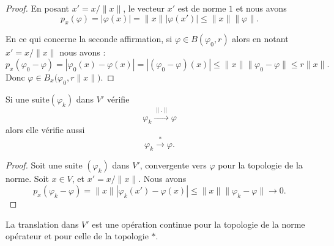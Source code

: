 \begin{proof}
	En posant \( x'=x/\| x \|\), le vecteur \( x'\) est de norme \( 1\) et nous avons
	\begin{equation}
		p_x(\varphi)=| \varphi(x) |=\| x \|| \varphi(x') |\leq \| x \|\| \varphi \|.
	\end{equation}

	En ce qui concerne la seconde affirmation, si \( \varphi\in B(\varphi_0,r)\) alors en notant \( x'=x/\| x \|\) nous avons :
	\begin{equation}
		p_x(\varphi_0-\varphi)=| \varphi_0(x)-\varphi(x) |=| (\varphi_0-\varphi)(x) |\leq \| x \|\| \varphi_0-\varphi \|\leq r\| x \|.
	\end{equation}
	Donc \( \varphi\in B_x\big( \varphi_0, r\| x \| \big)\).
\end{proof}

\begin{proposition}     \label{PROPooMINIooGCWsPR}
	Si une suite\( (\varphi_k)\) dans \( V'\) vérifie
	\begin{equation}
		\varphi_k\stackrel{\| . \|}{\longrightarrow}\varphi
	\end{equation}
	alors elle vérifie aussi
	\begin{equation}
		\varphi_k\stackrel{*}{\longrightarrow}\varphi.
	\end{equation}
\end{proposition}

\begin{proof}
	Soit une suite \( (\varphi_k)\) dans \( V'\), convergente vers \( \varphi\) pour la topologie de la norme.  Soit \( x\in V\), et \( x'=x/\| x \|\). Nous avons
	\begin{equation}
		p_x(\varphi_k-\varphi)=\| x \| | \varphi_k(x')-\varphi(x) |\leq \| x \| \| \varphi_k-\varphi \|\to 0.
	\end{equation}
\end{proof}

\begin{lemma}       \label{LEMooEAVEooAFveHn}
	La translation dans \( V'\) est une opération continue pour la topologie de la norme opérateur et pour celle de la topologie \( *\).
\end{lemma}

